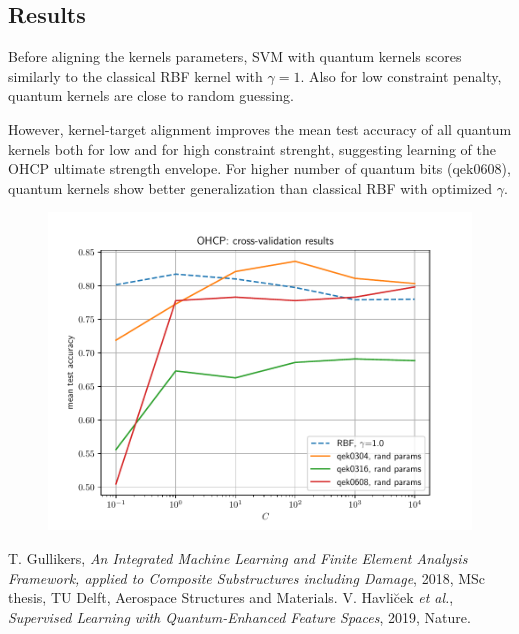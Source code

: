 \documentclass[9pt,a4paper]{extarticle}
\begin{document}
\begin{multicols}{2}
\section{Results}

Before aligning the kernels parameters, SVM with quantum kernels scores similarly to the classical RBF kernel with $\gamma=1$. Also for low constraint penalty, quantum kernels are close to random guessing.

However, kernel-target alignment improves the mean test accuracy of all quantum kernels both for low and for high constraint strenght, suggesting learning of the OHCP ultimate strength envelope. For higher number of quantum bits (qek0608), quantum kernels show better generalization than classical RBF with optimized $\gamma$.

\begin{figure}[H]
    \centering
    \includegraphics[width=.40\textwidth]{pics/acc-untrained.pdf}
\end{figure}


\begin{thebibliography}{99}
    T. Gullikers, \emph{An Integrated Machine Learning and Finite
    Element Analysis Framework, applied to
    Composite Substructures including Damage}, 2018, MSc thesis, TU Delft, Aerospace Structures and Materials.
    V. Havli\u{c}ek \emph{et al.}, \emph{Supervised Learning with Quantum-Enhanced Feature Spaces}, 2019, Nature.
\end{thebibliography}

\end{multicols}
\end{document}
